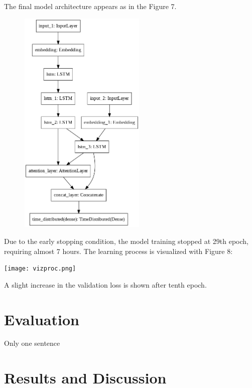 \documentclass[fleqn,10pt]{SelfArx} %
\begin{document}
The final model architecture appears as in the Figure 7.
\par
{\centering\vspace{10pt}
\includegraphics[width=8.2cm, height=11cm]{model.png}
\vspace{10pt}
\par}
Due to the early stopping condition, the model training stopped at 29th epoch, requiring almost 7 hours. The learning process is visualized with Figure 8:
\par
{\centering\vspace{10pt}
\texttt{[image: vizproc.png]}
\vspace{10pt}
\par}
A slight increase in the validation loss is shown after tenth epoch.
\section{Evaluation}
Only one sentence
\section{Results and Discussion}
\end{document}
